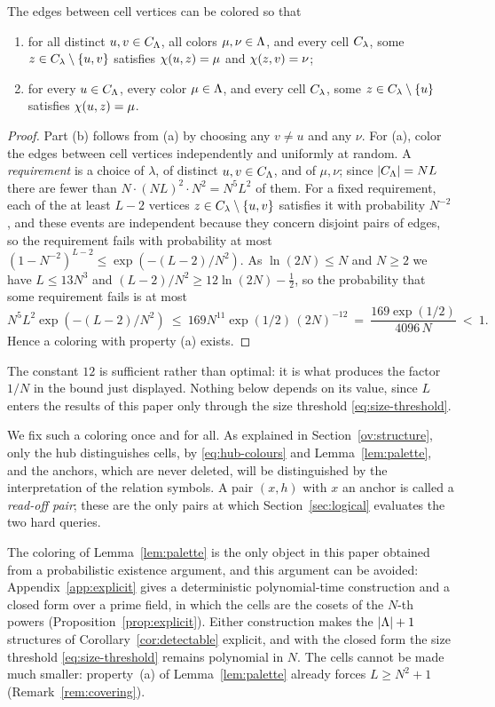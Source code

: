 \begin{lemma}\label{lem:palette}
The edges between cell vertices can be colored so that
\begin{enumerate}[nosep,label=(\alph*)]
\item for all distinct $u,v\in C_{\Lambda}$, all colors $\mu,\nu\in\Lambda$, and
 every cell $C_{\lambda}$, some $z\in C_{\lambda}\setminus\{u,v\}$
 satisfies $\chi(u,z)=\mu$ and $\chi(z,v)=\nu$;
\item for every $u\in C_{\Lambda}$, every color $\mu\in\Lambda$, and every cell
 $C_{\lambda}$, some $z\in C_{\lambda}\setminus\{u\}$ satisfies
 $\chi(u,z)=\mu$.
\end{enumerate}
\end{lemma}
\begin{proof}
Part (b) follows from (a) by choosing any $v\ne u$ and any $\nu$. For (a),
color the edges between cell vertices independently and uniformly at random.
A \emph{requirement} is a choice of $\lambda$, of distinct
$u,v\in C_{\Lambda}$, and of $\mu,\nu$; since $|C_{\Lambda}|=NL$ there are fewer
than $N\cdot(NL)^2\cdot N^2=N^5L^2$ of them. For a fixed requirement, each of
the at least $L-2$ vertices $z\in C_{\lambda}\setminus\{u,v\}$ satisfies it
with probability $N^{-2}$, and these events are independent because they
concern disjoint pairs of edges, so the requirement fails with probability at
most $(1-N^{-2})^{L-2}\le\exp(-(L-2)/N^2)$. As $\ln(2N)\le N$ and $N\ge2$ we
have $L\le13N^3$ and $(L-2)/N^2\ge12\ln(2N)-\tfrac12$, so the probability
that some requirement fails is at most
\[
 N^5L^2\exp(-(L-2)/N^2)
 \ \le\ 169N^{11}\exp(1/2)\,(2N)^{-12}
 \ =\ \frac{169\exp(1/2)}{4096\,N}\ <\ 1 .
\]
Hence a coloring with property (a) exists.
\end{proof}
The constant $12$ is sufficient rather than optimal: it is what produces
the factor $1/N$ in the bound just displayed. Nothing below depends on its
value, since $L$ enters the results of this paper only through the size
threshold \eqref{eq:size-threshold}.

We fix such a coloring once and for all. As explained in
Section~\ref{ov:structure}, only the hub distinguishes cells, by
\eqref{eq:hub-colours} and Lemma~\ref{lem:palette}, and the anchors, which
are never deleted, will be distinguished by the interpretation of the
relation symbols. A pair $(x,h)$ with $x$ an anchor is called a
\emph{read-off pair}; these are the only pairs at which
Section~\ref{sec:logical} evaluates the two hard queries.

The coloring of Lemma~\ref{lem:palette} is the only object in this paper
obtained from a probabilistic existence argument, and this argument can be
avoided: Appendix~\ref{app:explicit} gives a deterministic polynomial-time
construction and a closed form over a prime field, in which the cells are
the cosets of the $N$-th powers (Proposition~\ref{prop:explicit}). Either
construction makes the $|\Lambda|+1$ structures of
Corollary~\ref{cor:detectable} explicit, and with the closed form the size
threshold \eqref{eq:size-threshold} remains polynomial in $N$. The cells
cannot be made much smaller: property~(a) of Lemma~\ref{lem:palette}
already forces $L\ge N^2+1$ (Remark~\ref{rem:covering}).

